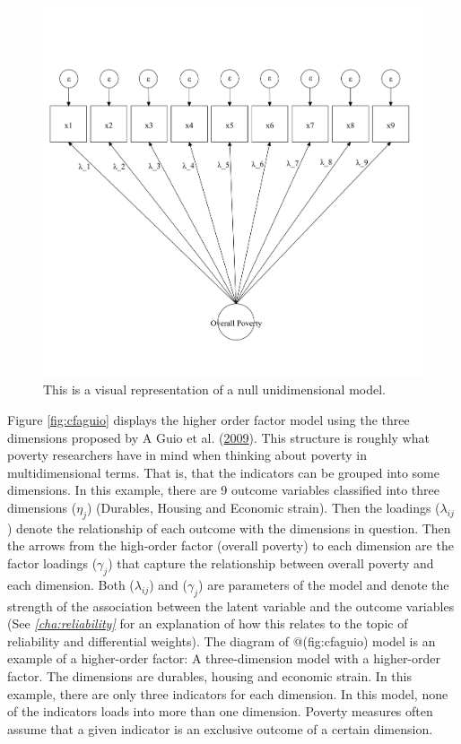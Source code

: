 \documentclass[]{book}
\begin{document}
\begin{figure}

{\centering \includegraphics[width=\textwidth]{Diagram_CFA_null} 

}

\caption{This is a visual representation of a null unidimensional model.}\label{fig:cfanull}
\end{figure}

Figure \ref{fig:cfaguio} displays the higher order factor model using the three dimensions proposed by A Guio et al. (\protect\hyperlink{ref-Guio2009}{2009}). This structure is roughly what poverty researchers have in mind when thinking about poverty in multidimensional terms. That is, that the indicators can be grouped into some dimensions. In this example, there are 9 outcome variables classified into three dimensions (\(\eta_j\)) (Durables, Housing and Economic strain). Then the loadings (\(\lambda_{ij}\)) denote the relationship of each outcome with the dimensions in question. Then the arrows from the high-order factor (overall poverty) to each dimension are the factor loadings (\(\gamma_{j}\)) that capture the relationship between overall poverty and each dimension. Both (\(\lambda_{ij}\)) and (\(\gamma_{j}\)) are parameters of the model and denote the strength of the association between the latent variable and the outcome variables (See \emph{\ref{cha:reliability}} for an explanation of how this relates to the topic of reliability and differential weights). The diagram of @(fig:cfaguio) model is an example of a higher-order factor: A three-dimension model with a higher-order factor. The dimensions are durables, housing and economic strain. In this example, there are only three indicators for each dimension. In this model, none of the indicators loads into more than one dimension. Poverty measures often assume that a given indicator is an exclusive outcome of a certain dimension.
\end{document}

